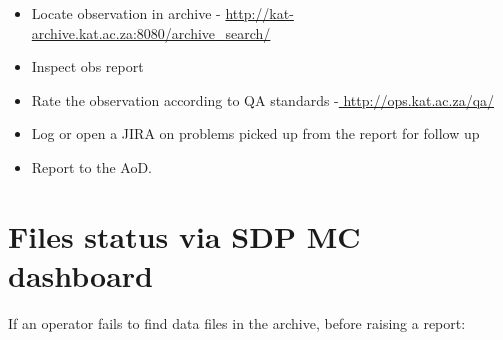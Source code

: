 \begin{itemize}
	
\item{} Locate observation in archive - \url{http://kat-archive.kat.ac.za:8080/archive\_search/}
\item{} Inspect obs report
\item{} Rate the observation according to QA standards -\url{ http://ops.kat.ac.za/qa/}
\item{} Log or open a JIRA on problems picked up from the report for follow up
\item{} Report to the AoD.
\end{itemize}
\section{ Files status via SDP MC dashboard} 
If an operator fails to find data files in the archive, before raising a report:
